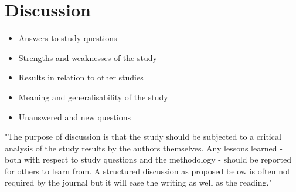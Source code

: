 \section*{Discussion}
\begin{itemize}
    \item Answers to study questions
    \item Strengths and weaknesses of the study
    \item Results in relation to other studies
    \item Meaning and generalisability of the study
    \item Unanswered and new questions
\end{itemize}

"The purpose of discussion is that the study should be subjected to a critical analysis of the study results
by the authors themselves. Any lessons learned - both with respect to study questions and the
methodology - should be reported for others to learn from.
A structured discussion as proposed below is often not required by the journal but it will ease the
writing as well as the reading."  